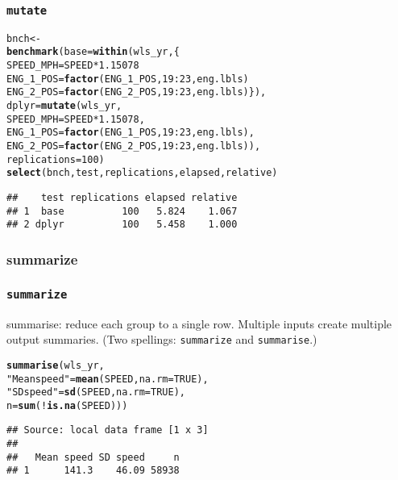 \documentclass{beamer}\usepackage[]{graphicx}\usepackage[]{color}
\makeatletter
\newcommand{\hlnum}[1]{\textcolor[rgb]{0.686,0.059,0.569}{#1}}%
\newcommand{\hlstr}[1]{\textcolor[rgb]{0.192,0.494,0.8}{#1}}%
\newcommand{\hlopt}[1]{\textcolor[rgb]{0,0,0}{#1}}%
\newcommand{\hlstd}[1]{\textcolor[rgb]{0.345,0.345,0.345}{#1}}%
\newcommand{\hlkwb}[1]{\textcolor[rgb]{0.69,0.353,0.396}{#1}}%
\newcommand{\hlkwc}[1]{\textcolor[rgb]{0.333,0.667,0.333}{#1}}%
\newcommand{\hlkwd}[1]{\textcolor[rgb]{0.737,0.353,0.396}{\textbf{#1}}}%
\newenvironment{kframe}{%
 \def\at@end@of@kframe{}%
 \ifinner\ifhmode%
  \def\at@end@of@kframe{\end{minipage}}%
  \begin{minipage}{\columnwidth}%
 \fi\fi%
 \def\FrameCommand##1{\hskip\@totalleftmargin \hskip-\fboxsep
 \colorbox{shadecolor}{##1}\hskip-\fboxsep
     \hskip-\linewidth \hskip-\@totalleftmargin \hskip\columnwidth}%
 \MakeFramed {\advance\hsize-\width
   \@totalleftmargin\z@ \linewidth\hsize
   \@setminipage}}%
 {\par\unskip\endMakeFramed%
 \at@end@of@kframe}
\newenvironment{knitrout}{}{} %
\makeatother
\begin{document}
\begin{frame}[fragile]
  \frametitle{{\tt mutate}}
\begin{knitrout}\footnotesize
{}\color{fgcolor}\begin{kframe}
\begin{alltt}
\hlstd{bnch} \hlkwb{<-}
\hlkwd{benchmark}\hlstd{(}\hlkwc{base} \hlstd{=} \hlkwd{within}\hlstd{(wls_yr, \{}
                        \hlstd{SPEED_MPH} \hlkwb{=} \hlstd{SPEED} \hlopt{*} \hlnum{1.15078}
                        \hlstd{ENG_1_POS} \hlkwb{=} \hlkwd{factor}\hlstd{(ENG_1_POS,} \hlnum{19}\hlopt{:}\hlnum{23}\hlstd{, eng.lbls)}
                        \hlstd{ENG_2_POS} \hlkwb{=} \hlkwd{factor}\hlstd{(ENG_2_POS,} \hlnum{19}\hlopt{:}\hlnum{23}\hlstd{, eng.lbls)\}),}
          \hlkwc{dplyr} \hlstd{=} \hlkwd{mutate}\hlstd{(wls_yr,}
                         \hlkwc{SPEED_MPH} \hlstd{= SPEED} \hlopt{*} \hlnum{1.15078}\hlstd{,}
                         \hlkwc{ENG_1_POS} \hlstd{=} \hlkwd{factor}\hlstd{(ENG_1_POS,} \hlnum{19}\hlopt{:}\hlnum{23}\hlstd{, eng.lbls),}
                         \hlkwc{ENG_2_POS} \hlstd{=} \hlkwd{factor}\hlstd{(ENG_2_POS,} \hlnum{19}\hlopt{:}\hlnum{23}\hlstd{, eng.lbls)),}
          \hlkwc{replications} \hlstd{=} \hlnum{100}\hlstd{)}
\hlkwd{select}\hlstd{(bnch, test, replications, elapsed, relative)}
\end{alltt}
\begin{verbatim}
##    test replications elapsed relative
## 1  base          100   5.824    1.067
## 2 dplyr          100   5.458    1.000
\end{verbatim}
\end{kframe}
\end{knitrout}
\end{frame} 

\subsubsection{summarize}%
\begin{frame}[fragile]
  \frametitle{{\tt summarize}}
summarise: reduce each group to a single row. Multiple
inputs create multiple output summaries.  (Two spellings:
{\tt summarize} and {\tt summarise}.)
\begin{knitrout}\footnotesize
{}\color{fgcolor}\begin{kframe}
\begin{alltt}
\hlkwd{summarise}\hlstd{(wls_yr,}
          \hlstr{"Mean speed"} \hlstd{=} \hlkwd{mean}\hlstd{(SPEED,} \hlkwc{na.rm} \hlstd{=} \hlnum{TRUE}\hlstd{),}
          \hlstr{"SD speed"}   \hlstd{=} \hlkwd{sd}\hlstd{(SPEED,} \hlkwc{na.rm} \hlstd{=} \hlnum{TRUE}\hlstd{),}
          \hlkwc{n}            \hlstd{=} \hlkwd{sum}\hlstd{(}\hlopt{!}\hlkwd{is.na}\hlstd{(SPEED)))}
\end{alltt}
\begin{verbatim}
## Source: local data frame [1 x 3]
## 
##   Mean speed SD speed     n
## 1      141.3    46.09 58938
\end{verbatim}
\end{kframe}
\end{knitrout}
\end{frame} 
\end{document}
